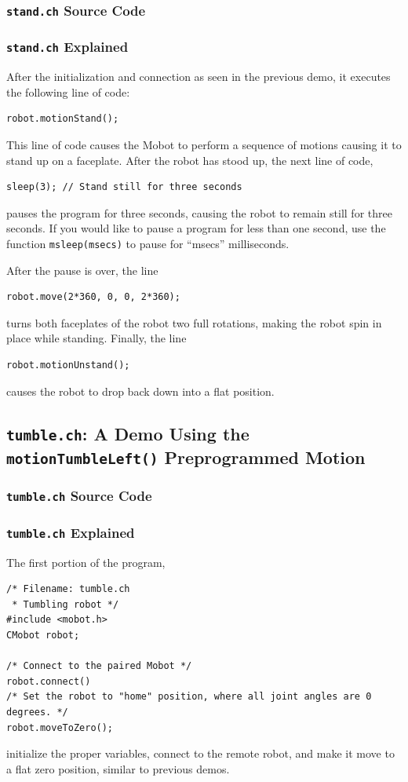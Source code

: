\documentclass{article}
\begin{document}
\subsubsection{\texttt{stand.ch} Source Code}

\subsubsection{\texttt{stand.ch} Explained}
After the initialization and 
connection as seen in the previous demo, it executes the following line of
code:
\begin{verbatim}
robot.motionStand();
\end{verbatim}
This line of code causes the Mobot to perform a sequence of motions causing it to
stand up on a faceplate. After the robot has stood up, the next line of code,
\begin{verbatim}
sleep(3); // Stand still for three seconds
\end{verbatim}
pauses the program for three seconds, causing the robot to remain still for three
seconds. If you would like to pause a program for less than one second, use the 
function \texttt{msleep(msecs)} to pause for ``msecs'' milliseconds.

After the pause is over, the line
\begin{verbatim}
robot.move(2*360, 0, 0, 2*360);
\end{verbatim}
turns both faceplates of the robot two full rotations, making the robot spin in place
while standing. Finally, the line
\begin{verbatim}
robot.motionUnstand();
\end{verbatim}
causes the robot to drop back down into a flat position.

\subsection{\texttt{tumble.ch}: A Demo Using the \texttt{motionTumbleLeft()} Preprogrammed
Motion}
\subsubsection{\texttt{tumble.ch} Source Code}

\subsubsection{\texttt{tumble.ch} Explained}
The first portion of the program,
\begin{verbatim}
/* Filename: tumble.ch 
 * Tumbling robot */
#include <mobot.h>
CMobot robot;

/* Connect to the paired Mobot */
robot.connect()
/* Set the robot to "home" position, where all joint angles are 0 degrees. */
robot.moveToZero();
\end{verbatim}
initialize the proper variables, connect to the remote robot, and make it move
to a flat zero position, similar to previous demos.
\end{document}
